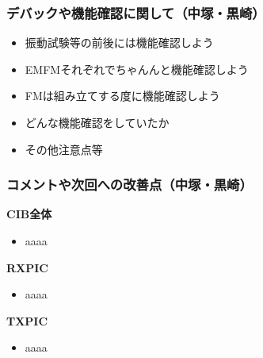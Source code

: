 \subsubsection{デバックや機能確認に関して（中塚・黒崎）}
\begin{itemize}
	\item 振動試験等の前後には機能確認しよう
	\item EMFMそれぞれでちゃんんと機能確認しよう
	\item FMは組み立てする度に機能確認しよう
	\item どんな機能確認をしていたか
	\item その他注意点等
\end{itemize}

\subsubsection{コメントや次回への改善点（中塚・黒崎）}
\hspace{2ex}
\textbf{CIB全体}
\begin{itemize}
	\item aaaa
\end{itemize}

\hspace{2ex}
\textbf{RXPIC}
\begin{itemize}
	\item aaaa
\end{itemize}

\hspace{2ex}
\textbf{TXPIC}
\begin{itemize}
	\item aaaa
\end{itemize}
